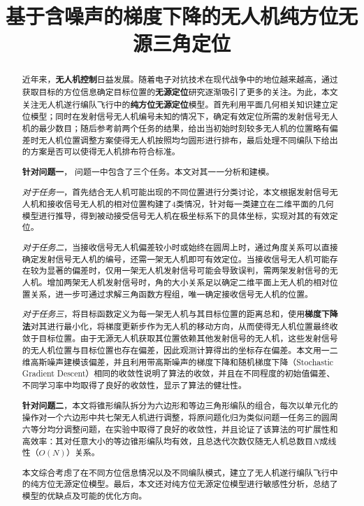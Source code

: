 \documentclass[withoutpreface,bwprint]{cumcmthesis} %
\title{基于含噪声的梯度下降的无人机纯方位无源三角定位}
\begin{document}
 \maketitle
 \begin{abstract}

近年来，\textbf{无人机控制}日益发展。随着电子对抗技术在现代战争中的地位越来越高，通过获取目标的方位信息确定目标位置的\textbf{无源定位}研究逐渐吸引了更多的关注。为此，本文关注无人机遂行编队飞行中的\textbf{纯方位无源定位}模型。首先利用平面几何相关知识建立定位模型；同时在发射信号无人机编号未知的情况下，确定有效定位所需的发射信号无人机的最少数目；随后参考前两个任务的结果，给出当初始时刻较多无人机的位置略有偏差时无人机位置调整方案使得无人机按照均匀圆形进行排布，最后处理不同编队下给出的方案是否可以使得无人机排布符合标准。

 \textbf{针对问题一}， 问题一中包含了三个任务。本文对其一一分析和建模。
 
 \textit{对于任务一}，首先结合无人机可能出现的不同位置进行分类讨论，本文根据发射信号无人机和接收信号无人机的相对位置构建了4类情况，针对每一类建立在二维平面的几何模型进行推导，得到被动接受信号无人机在极坐标系下的具体坐标，实现对其的有效定位。
 
 \textit{对于任务二}，当接收信号无人机偏差较小时或始终在圆周上时，通过角度关系可以直接确定发射信号无人机的编号，还需一架无人机即可有效定位。当接收信号无人机可能存在较为显著的偏差时，仅用一架无人机发射信号可能会导致误判，需两架发射信号的无人机。增加两架无人机发射信号时，角的大小关系足以确定二维平面上无人机的相对位置关系，进一步可通过求解三角函数方程组，唯一确定接收信号无人机的位置。  
 
\textit{对于任务三}，将目标函数定义为每一架无人机与其目标位置的距离总和，使用\textbf{梯度下降法}对其进行最小化，将梯度更新步作为无人机的移动方向，从而使得无人机位置最终收敛于目标位置。由于无源无人机获取其位置依赖其他发射信号的无人机，这些发射信号的无人机位置与目标位置也存在偏差，因此观测计算得出的坐标存在偏差。本文用一二维高斯噪声建模该偏差，并且利用带高斯噪声的梯度下降和随机梯度下降（Stochastic Gradient Descent）相同的收敛性说明了算法的收敛，并且在不同程度的初始值偏差、不同学习率中均取得了良好的收敛性，显示了算法的健壮性。
 
 \textbf{针对问题二}，本文将锥形编队拆分为六边形和等边三角形编队的组合，每次以单元化的操作对一个六边形中共七架无人机进行调整，将原问题化归为类似问题一任务三的圆周六等分均分调整问题，在实验中取得了良好的收敛性，并且论证了该算法的可扩展性和高效率：其对任意大小的等边锥形编队均有效，且总迭代次数仅随无人机总数目$N$成线性（$O(N)$）关系。
 
 本文综合考虑了在不同方位信息情况以及不同编队模式，建立了无人机遂行编队飞行中的纯方位无源定位模型。最后，本文还对纯方位无源定位模型进行敏感性分析，总结了模型的优缺点及可能的优化方向。



\end{abstract}
\end{document}
